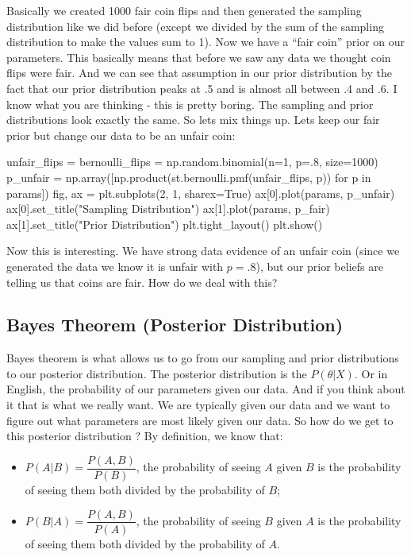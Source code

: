 Basically we created 1000 fair coin flips and then generated the sampling distribution like we did before (except we divided by the sum of the sampling distribution to make the values sum to 1). Now we have a “fair coin” prior on our parameters. This basically means that before we saw any data we thought coin flips were fair. And we can see that assumption in our prior distribution by the fact that our prior distribution peaks at .5 and is almost all between .4 and .6.
I know what you are thinking - this is pretty boring. The sampling and prior distributions look exactly the same. So lets mix things up. Lets keep our fair prior but change our data to be an unfair coin:

\begin{ipython}
unfair_flips = bernoulli_flips = np.random.binomial(n=1, p=.8, size=1000)
p_unfair = np.array([np.product(st.bernoulli.pmf(unfair_flips, p)) for p in params])
fig, ax = plt.subplots(2, 1, sharex=True)
ax[0].plot(params, p_unfair)
ax[0].set_title("Sampling Distribution")
ax[1].plot(params, p_fair)
ax[1].set_title("Prior Distribution")
plt.tight_layout()
plt.show()
\end{ipython}

Now this is interesting. We have strong data evidence of an unfair coin (since we generated the data we know it is unfair with $p=.8$), but our prior beliefs are telling us that coins are fair. How do we deal with this?

\subsection{Bayes Theorem (Posterior Distribution)}
Bayes theorem is what allows us to go from our sampling and prior distributions to our posterior distribution. The posterior distribution is the $P(\theta|X)$. Or in English, the probability of our parameters given our data. And if you think about it that is what we really want. We are typically given our data and we want to figure out what parameters are most likely given our data. So how do we get to this posterior distribution ? 
By definition, we know that:
\begin{itemize}
\item $P(A|B) = \dfrac{P(A,B)}{P(B)}$, the probability of seeing $A$ given $B$ is the probability of seeing them both divided by the probability of $B$;
\item $P(B|A) = \dfrac{P(A,B)}{P(A)}$, the probability of seeing $B$ given $A$ is the probability of seeing them both divided by the probability of $A$.
\end{itemize}

